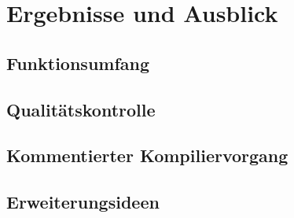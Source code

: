 \chapter{Ergebnisse und Ausblick}
\label{ch:ergebnisse_und_ausblick}

\section{Funktionsumfang}
\section{Qualitätskontrolle}
\section{Kommentierter Kompiliervorgang}
\section{Erweiterungsideen}
